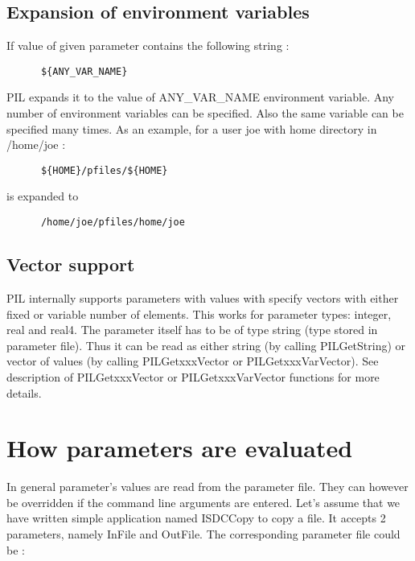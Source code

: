 \subsection{Expansion of environment variables}\label{PILRefEnvExpansion}

If value of given parameter contains the following string :

\begin{verbatim}
      ${ANY_VAR_NAME}
\end{verbatim}

PIL expands it to the value of ANY\_VAR\_NAME environment variable. Any number
of environment variables can be specified. Also the same variable can be
specified many times. As an example, for a user joe with home directory
in /home/joe :

\begin{verbatim}
      ${HOME}/pfiles/${HOME}
\end{verbatim}

is expanded to

\begin{verbatim}
      /home/joe/pfiles/home/joe
\end{verbatim}

\subsection{Vector support}\label{PILRefVector}

PIL internally supports parameters with values with specify vectors with
either fixed or variable number of elements. This works for parameter
types: integer, real and real4. The parameter itself has
to be of type string (type stored in parameter file). Thus it can be read 
as either string (by calling PILGetString) or vector of values
(by calling PILGetxxxVector or PILGetxxxVarVector). See description of
PILGetxxxVector or PILGetxxxVarVector functions for more details.


\section{How parameters are evaluated}\label{PILRefEvaluate}

In general parameter's values are read from the parameter file. They can
however be overridden if the command line arguments are entered. 
Let's assume that we have written simple application named ISDCCopy to 
copy a file. It accepts 2 parameters, namely InFile and OutFile. 
The corresponding parameter file could be : 
  

